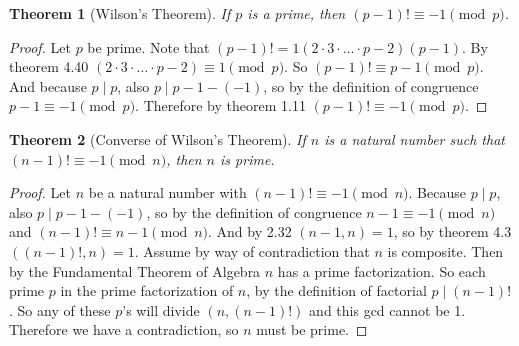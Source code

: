 \documentclass[12pt,leqno]{article}
\numberwithin{equation}{section}
\newtheorem{thm}{Theorem}[section]
\theoremstyle{definition}
\begin{document}

\begin{thm}[Wilson's Theorem]
If $p$ is a prime, then $(p - 1)! \equiv -1 \pmod{p}$.
\end{thm}
\begin{proof}[Proof]
Let $p$ be prime.  Note that $(p - 1)! = 1(2\cdot 3\cdot \hdots \cdot p-2)(p-1)$.  By theorem 4.40 $(2\cdot 3\cdot \hdots \cdot p-2) \equiv 1 \pmod{p}$.  So $(p-1)! \equiv p-1 \pmod{p}$.  And because $p \mid p$, also $p \mid p-1 - (-1)$, so by the definition of congruence $p-1 \equiv -1 \pmod{p}$.  Therefore by theorem 1.11 $(p - 1)! \equiv -1 \pmod{p}$.
\end{proof}

\begin{thm}[Converse of Wilson's Theorem]
If $n$ is a natural number such that $(n - 1)! \equiv -1 \pmod{n}$,
then $n$ is prime.
\end{thm}
\begin{proof}[Proof]
Let $n$ be a natural number with $(n - 1)! \equiv -1 \pmod{n}$.  Because $p \mid p$, also $p \mid p-1 - (-1)$, so by the definition of congruence $n-1 \equiv -1 \pmod{n}$ and $(n - 1)! \equiv n-1 \pmod{n}$.  And by 2.32 $(n-1, n) = 1$, so by theorem 4.3 $((n-1)!, n) = 1$.  Assume by way of contradiction that $n$ is composite.  Then by the Fundamental Theorem of Algebra $n$ has a prime factorization.  So each prime $p$ in the prime factorization of $n$, by the definition of factorial $p \mid (n-1)!$.  So any of these $p$'s will divide $(n, (n-1)!)$ and this gcd cannot be 1.  Therefore we have a contradiction, so $n$ must be prime.
\end{proof}
\end{document}
